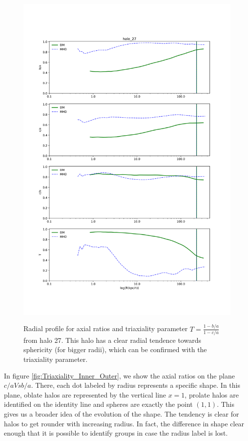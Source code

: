 \begin{figure}
\centering
{\includegraphics[width=1\columnwidth]{./pics/MHD_Vs_DM/level4_halo_27_DM_Vs_MHD.png}}
\caption{Radial profile for axial ratios and triaxiality parameter $T=\frac{1-b/a}{1-c/a}$ from halo 27. This halo has a clear radial tendence towards sphericity (for bigger radii), which can be confirmed with the triaxiality parameter. }
\label{fig:DM_MHD}
\end{figure} 


In figure \ref{fig:Triaxiality_Inner_Outer}, we show the axial ratios on the plane $c/a Vs b/a$. There, each dot labeled by radius represents a specific shape. In this plane, oblate halos are represented by the vertical line $x = 1$, prolate halos are identified on the identity line and spheres are exactly the point $(1,1)$. This gives us a broader idea of the evolution of the shape. The tendency is clear for halos to get rounder with increasing radius. In fact, the difference in shape clear enough that it is possible to identify groups in case the radius label is lost.\\

